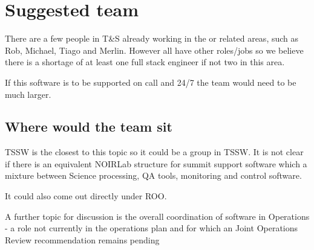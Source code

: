 \section{Suggested team} \label{sec:team}

There are a few people in T\&S already working in the or related areas, such as Rob, Michael, Tiago and Merlin.
However all have other roles/jobs so we believe there is a shortage of at least one full \gls{stack} engineer if not two in this area.


If this \gls{software} is to be supported on call and 24/7 the team would need to be much larger.


\subsection{Where would the team sit}
TSSW is the closest to this topic so it could be a group in TSSW.
It is not clear if there is an equivalent \gls{NOIRLab} structure for summit support software which
a mixture between Science processing, \gls{QA} tools, monitoring and control software.

It could also come out directly under \gls{ROO}.

A further topic for discussion is the overall coordination of software in \VRO  \gls{Operations} - a role not currently in the operations plan and for which an Joint \gls{Operations} Review recommendation remains pending

